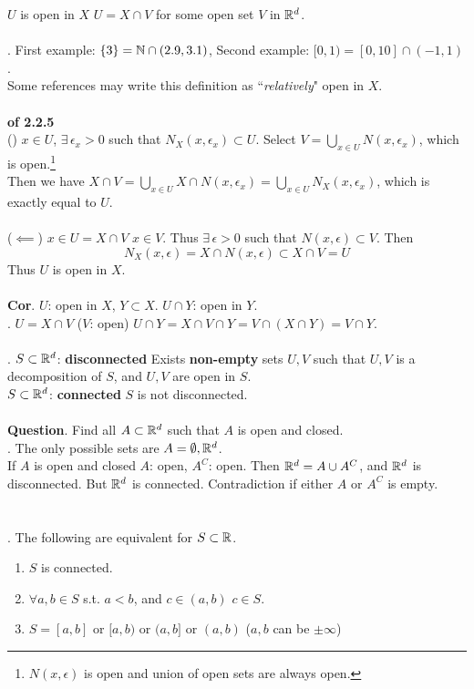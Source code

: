  $U$ is open in $X$ \miff $U = X\cap V$ for some open set $V$ in $\mathbb{R}^d$.\\
\\
\rmk. First example: $\{3\} = \mathbb{N} \cap (2.9, 3.1)$, Second example: $[0, 1) = [0, 10] \cap (-1, 1)$.\\
Some references may write this definition as ``\textit{relatively}" open in $X$.\\
\\
\pf\textbf{ of 2.2.5}\\
(\mimp) $x\in U$, $\exists\, \epsilon_x >0$ such that $N_X(x, \epsilon_x) \subset U$. Select $V = \bigcup_{x\in U} N(x, \epsilon_x)$, which is open.\footnote{$N(x, \epsilon)$ is open and union of open sets are always open.}\\
Then we have $X \cap V = \bigcup_{x\in U} X\cap N(x, \epsilon_x) = \bigcup_{x\in U} N_X(x, \epsilon_x)$, which is exactly equal to $U$.\\
\\
($\impliedby$) $x\in U = X\cap V$ \mimp $x\in V$. Thus $\exists\, \epsilon>0$ such that $N(x, \epsilon)\subset V$. Then $$N_X(x, \epsilon) = X\cap N(x, \epsilon) \subset X\cap V = U$$ Thus $U$ is open in $X$.\\
\\
\textbf{Cor}. $U$: open in $X$, $Y\subset X$. \mimp $U\cap Y$: open in $Y$.\\
\pf. $U = X\cap V$ ($V$: open) \mimp $U\cap Y = X\cap V\cap Y = V \cap (X\cap Y) = V\cap Y$.\\
\\
. $S\subset \mathbb{R}^d$: \textbf{disconnected} \miff Exists \textbf{non-empty} sets $U, V$ such that $U, V$ is a decomposition of $S$, and $U, V$ are open in $S$.\\
$S\subset \mathbb{R}^d$: \textbf{connected} \miff $S$ is not disconnected.\\
\\
\textbf{Question}. Find all $A\subset \mathbb{R}^d$ such that $A$ is open and closed.\\
\pf. The only possible sets are $A = \emptyset, \mathbb{R}^d$.\\
If $A$ is open and closed \mimp $A$: open, $A^C$: open. Then $\mathbb{R}^d = A\cup A^C$, and $\mathbb{R}^d$ is disconnected. But $\mathbb{R}^d$ is connected. Contradiction if either $A$ or $A^C$ is empty.\\
\\
\\
\thm{}. The following are equivalent for $S\subset \mathbb{R}$.
\begin{enumerate}
	\item $S$ is connected.
	\item $\forall a, b\in S$ s.t. $a<b$, and $c\in (a, b)$ \mimp $c\in S$.
	\item $S = [a, b]$ or $[a, b)$ or $(a, b]$ or $(a, b)$ ($a, b$ can be $\pm\infty$)
\end{enumerate} 
